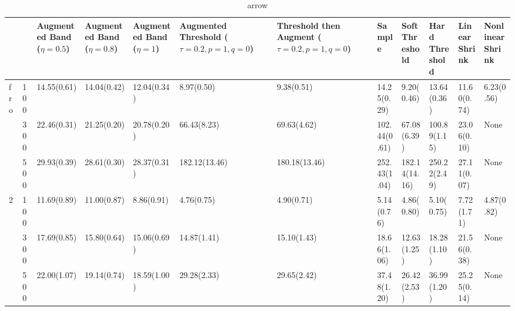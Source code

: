 \begin{table}[htbp]
\centering
\caption{arrow}
\label{my label}
\begin{tabular}{ll|p{2cm}p{2cm}p{2cm}p{2cm}p{2cm}p{2cm}p{2cm}p{2cm}p{2cm}p{2cm}}
\toprule
  &     & Augmented Band ($\eta=0.5$) & Augmented Band ($\eta=0.8$) & Augmented Band ($\eta=1$) & Augmented Threshold ($\tau=0.2, p=1, q=0$) & Threshold then Augment ($\tau=0.2, p=1, q=0$) &        Sample & Soft Threshold & Hard Threshold & Linear Shrink & Nonlinear Shrink \\
\midrule
fro & 100 &                 14.55(0.61) &                 14.04(0.42) &               12.04(0.34) &                                 8.97(0.50) &                                    9.38(0.51) &   14.25(0.29) &     9.20(0.46) &    13.64(0.36) &   11.60(0.74) &       6.23(0.56) \\
  & 300 &                 22.46(0.31) &                 21.25(0.20) &               20.78(0.20) &                                66.43(8.23) &                                   69.63(4.62) &  102.44(0.61) &    67.08(6.39) &   100.89(1.15) &   23.06(0.10) &             None \\
  & 500 &                 29.93(0.39) &                 28.61(0.30) &               28.37(0.31) &                              182.12(13.46) &                                 180.18(13.46) &  252.43(1.04) &  182.14(14.16) &   250.22(2.49) &   27.11(0.07) &             None \\
2 & 100 &                 11.69(0.89) &                 11.00(0.87) &                8.86(0.91) &                                 4.76(0.75) &                                    4.90(0.71) &    5.14(0.76) &     4.86(0.80) &     5.10(0.75) &    7.72(1.71) &       4.87(0.82) \\
  & 300 &                 17.69(0.85) &                 15.80(0.64) &               15.06(0.69) &                                14.87(1.41) &                                   15.10(1.43) &   18.66(1.06) &    12.63(1.25) &    18.28(1.10) &   21.56(0.38) &             None \\
  & 500 &                 22.00(1.07) &                 19.14(0.74) &               18.59(1.00) &                                29.28(2.33) &                                   29.65(2.42) &   37.48(1.20) &    26.42(2.53) &    36.99(1.20) &   25.25(0.14) &             None \\
\bottomrule
\end{tabular}
\end{table}
